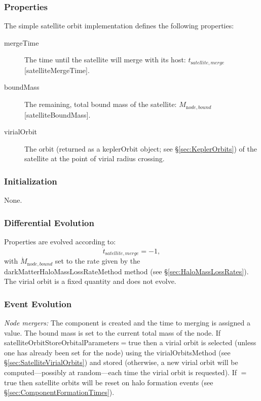 \subsubsection{Properties}

The simple satellite orbit implementation defines the following properties:
\begin{description}
 \item [{\normalfont \ttfamily mergeTime}] The time until the satellite will merge with its host: $t_{\mathrm satellite, merge}$ [{\normalfont \ttfamily satelliteMergeTime}].
 \item [{\normalfont \ttfamily boundMass}] The remaining, total bound mass of the satellite: $M_{\mathrm node,bound}$ [{\normalfont \ttfamily satelliteBoundMass}].
 \item[{\normalfont \ttfamily virialOrbit}] The orbit (returned as a {\normalfont \ttfamily keplerOrbit} object; see \S\ref{sec:KeplerOrbits}) of the satellite at the point of virial radius crossing.
\end{description}

\subsubsection{Initialization}

None.

\subsubsection{Differential Evolution}

Properties are evolved according to:
\begin{equation}
 \dot{t}_{\mathrm satellite, merge} = -1,
\end{equation}
with $\dot{M}_{\mathrm node,bound}$ set to the rate given by the {\normalfont \ttfamily darkMatterHaloMassLossRateMethod} method (see \S\ref{sec:HaloMassLossRates}). The virial orbit is a fixed quantity and does not evolve.

\subsubsection{Event Evolution}

\noindent\emph{Node mergers:} The \gls{component} is created and the time to merging is assigned a value. The bound mass is set to the current total mass of the node. If {\normalfont \ttfamily satelliteOrbitStoreOrbitalParameters}$=${\normalfont \ttfamily true} then a virial orbit is selected (unless one has already been set for the node) using the {\normalfont \ttfamily virialOrbitsMethod} (see \S\ref{sec:SatelliteVirialOrbits}) and stored (otherwise, a new virial orbit will be computed---possibly at random---each time the virial orbit is requested). If {\normalfont \ttfamily [satelliteOrbitResetOnHaloFormation]}$=${\normalfont \ttfamily true} then satellite orbits will be reset on halo formation events (see \S\ref{sec:ComponentFormationTimes}).\\

